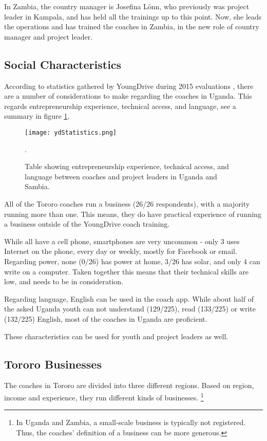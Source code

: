 In Zambia, the country manager is Josefina Lönn, who previously was project leader in Kampala, and has held all the trainings up to this point. Now, she leads the operations and has trained the coaches in Zambia, in the new role of country manager and project leader.

\subsection{Social Characteristics}

According to statistics gathered by YoungDrive during 2015 evaluations \citep{youngdrive-statistics}, there are a number of considerations to make regarding the coaches in Uganda. This regards entrepreneurship experience, technical access, and language, see a summary in figure \ref{fig:ydStatistics}.

\begin{figure}[h]
    \centering
    \texttt{[image: ydStatistics.png]}
    \caption{Table showing entrepreneurship experience, technical access, and language between coaches and project leaders in Uganda and Sambia.}.
    \label{fig:ydStatistics}
\end{figure}

All of the Tororo coaches run a business (26/26 respondents), with a majority running more than one. This means, they do have practical experience of running a business outside of the YoungDrive coach training.

While all have a cell phone, smartphones are very uncommon - only 3 uses Internet on the phone, every day or weekly, mostly for Facebook or email. Regarding power, none (0/26) has power at home, 3/26 has solar, and only 4 can write on a computer. Taken together this means that their technical skills are low, and needs to be in consideration.

Regarding language, English can be used in the coach app. While about half of the asked Uganda youth can not understand (129/225), read (133/225) or write (132/225) English, most of the coaches in Uganda are proficient.

These characteristics can be used for youth and project leaders as well.

\subsection{Tororo Businesses}

The coaches in Tororo are divided into three different regions. Based on region, income and experience, they run different kinds of businesses. \footnote{In Uganda and Zambia, a small-scale business is typically not registered. Thus, the coaches' definition of a business can be more generous.}

